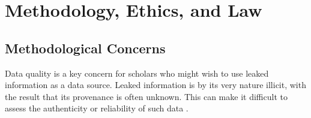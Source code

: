 \documentclass[12pt]{article}
\begin{document}



\section{Methodology, Ethics, and Law}

\subsection{Methodological Concerns}

Data quality is a key concern for scholars who might wish to use leaked information as a data source. 
Leaked information is by its very nature illicit, with the result that its provenance is often unknown. 
This can make it difficult to assess the authenticity 
or reliability of such data \citep{kelly2012wikileaks:}.
\end{document}

